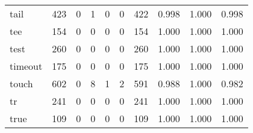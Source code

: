 \begin{longtable}{lp{1.3cm}p{1.3cm}p{1.3cm}p{1.3cm}p{1.3cm}p{1.3cm}p{1.3cm}p{1.3cm}p{1.3cm}}
tail      &                    423 &                                  0 &                                 1 &                                0 &                                 0 &                             422 &                                   0.998 &                                  1.000 &                                0.998 \\
tee       &                    154 &                                  0 &                                 0 &                                0 &                                 0 &                             154 &                                   1.000 &                                  1.000 &                                1.000 \\
test      &                    260 &                                  0 &                                 0 &                                0 &                                 0 &                             260 &                                   1.000 &                                  1.000 &                                1.000 \\
timeout   &                    175 &                                  0 &                                 0 &                                0 &                                 0 &                             175 &                                   1.000 &                                  1.000 &                                1.000 \\
touch     &                    602 &                                  0 &                                 8 &                                1 &                                 2 &                             591 &                                   0.988 &                                  1.000 &                                0.982 \\
tr        &                    241 &                                  0 &                                 0 &                                0 &                                 0 &                             241 &                                   1.000 &                                  1.000 &                                1.000 \\
true      &                    109 &                                  0 &                                 0 &                                0 &                                 0 &                             109 &                                   1.000 &                                  1.000 &                                1.000 \\

\end{longtable}
